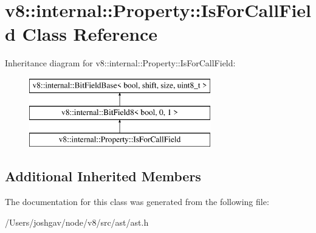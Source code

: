\hypertarget{classv8_1_1internal_1_1_property_1_1_is_for_call_field}{}\section{v8\+:\+:internal\+:\+:Property\+:\+:Is\+For\+Call\+Field Class Reference}
\label{classv8_1_1internal_1_1_property_1_1_is_for_call_field}
Inheritance diagram for v8\+:\+:internal\+:\+:Property\+:\+:Is\+For\+Call\+Field\+:\begin{figure}[H]
\begin{center}
\leavevmode
\includegraphics[height=3.000000cm]{classv8_1_1internal_1_1_property_1_1_is_for_call_field}
\end{center}
\end{figure}
\subsection*{Additional Inherited Members}


The documentation for this class was generated from the following file\+:\begin{DoxyCompactItemize}
\item 
/\+Users/joshgav/node/v8/src/ast/ast.\+h\end{DoxyCompactItemize}
